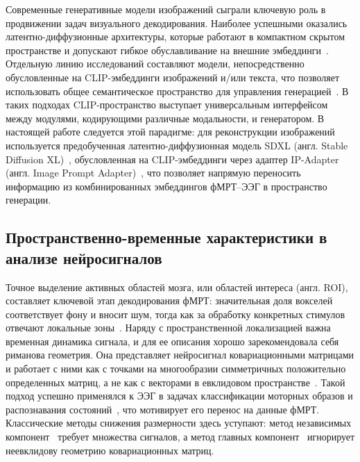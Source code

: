 Современные генеративные модели изображений сыграли ключевую роль в продвижении задач визуального декодирования. Наиболее успешными оказались латентно-диффузионные архитектуры, которые работают в компактном скрытом пространстве и допускают гибкое обуславливание на внешние эмбеддинги~\cite{esser2021tamingtransformershighresolutionimage, hatamizadeh2024diffitdiffusionvisiontransformers}. Отдельную линию исследований составляют модели, непосредственно обусловленные на CLIP-эмбеддинги изображений и/или текста, что позволяет использовать общее семантическое пространство для управления генерацией~\cite{radford2021learning, crowson2022vqganclipopendomainimage}. В таких подходах CLIP-пространство выступает универсальным интерфейсом между модулями, кодирующими различные модальности, и генератором. В настоящей работе следуется этой парадигме: для реконструкции изображений используется предобученная латентно-диффузионная модель SDXL (англ. Stable Diffusion XL)~\cite{podell2023sdxlimprovinglatentdiffusion}, обусловленная на CLIP-эмбеддинги через адаптер IP-Adapter (англ. Image Prompt Adapter)~\cite{podell2023sdxlimprovinglatentdiffusion, ye2023ipadaptertextcompatibleimage}, что позволяет напрямую переносить информацию из комбинированных эмбеддингов фМРТ--ЭЭГ в пространство генерации.

\subsection{Пространственно-временные характеристики в анализе нейросигналов}\label{sec1:spatiotemporal}

Точное выделение активных областей мозга, или областей интереса (англ. ROI), составляет ключевой этап декодирования фМРТ: значительная доля вокселей соответствует фону и вносит шум, тогда как за обработку конкретных стимулов отвечают локальные зоны~\cite{poldrack2007region, dorin2024forecasting}. Наряду с пространственной локализацией важна временная динамика сигнала, и для ее описания хорошо зарекомендовала себя риманова геометрия. Она представляет нейросигнал ковариационными матрицами и работает с ними как с точками на многообразии симметричных положительно определенных матриц, а не как с векторами в евклидовом пространстве~\cite{barachant2010riemannian, barachant2011multiclass}. Такой подход успешно применялся к ЭЭГ в задачах классификации моторных образов и распознавания состояний~\cite{congedo2017riemannian, yger2016riemannian, samokhina2022classification}, что мотивирует его перенос на данные фМРТ. Классические методы снижения размерности здесь уступают: метод независимых компонент~\cite{hyvarinen2000independent} требует множества сигналов, а метод главных компонент~\cite{Jolliffe2002} игнорирует неевклидову геометрию ковариационных матриц.

